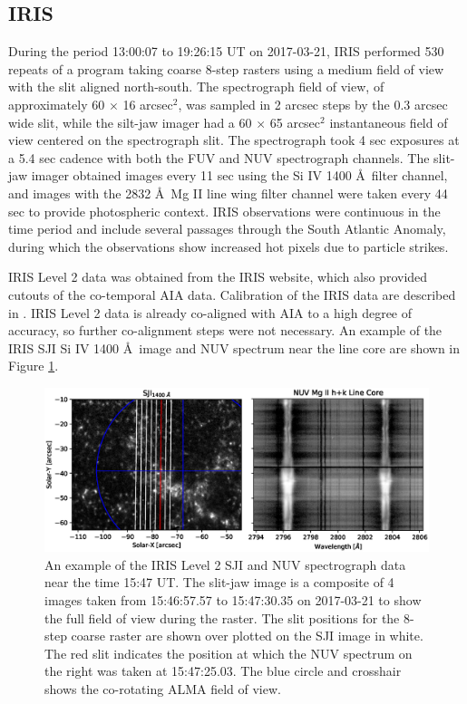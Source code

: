 \documentclass[twocolumn]{aastex62}
\begin{document}
\subsection{IRIS}
During the period 13:00:07 to 19:26:15 UT on 2017-03-21, IRIS performed 530 repeats of a program taking coarse 8-step rasters using a medium field of view with the slit aligned north-south.  The spectrograph field of view, of approximately 60 $\times$ 16 arcsec$^2$, was sampled in 2 arcsec steps by the 0.3 arcsec wide slit, while the silt-jaw imager had a 60 $\times$ 65 arcsec$^2$ instantaneous field of view centered on the spectrograph slit.  The spectrograph took 4 sec exposures at a 5.4 sec cadence with both the FUV and NUV spectrograph channels. The slit-jaw imager obtained images every 11 sec using the Si IV 1400 \AA\ filter channel, and images with the 2832 \AA\ Mg II line wing filter channel were taken every 44 sec to provide photospheric context.  IRIS observations were continuous in the time period and include several passages through the South Atlantic Anomaly, during which the observations show increased hot pixels due to particle strikes.

IRIS Level 2 data was obtained from the IRIS website, which also provided cutouts of the co-temporal AIA data.  Calibration of the IRIS data are described in \citet{wuelser18}.  IRIS Level 2 data is already co-aligned with AIA to a high degree of accuracy, so further co-alignment steps were not necessary.  An example of the IRIS SJI Si IV 1400 \AA\ image and NUV spectrum near the line core are shown in Figure \ref{fig:IRIS}.

\begin{figure}
    \centering
    \includegraphics[width=7in]{./figures/IRIS_example.eps}
    \caption{An example of the IRIS Level 2 SJI and NUV spectrograph data near the time 15:47 UT.  The slit-jaw image is a composite of 4 images taken from 15:46:57.57 to 15:47:30.35 on 2017-03-21 to show the full field of view during the raster.  The slit positions for the 8-step coarse raster are shown over plotted on the SJI image in white.  The red slit indicates the position at which the NUV spectrum on the right was taken at 15:47:25.03.  The blue circle and crosshair shows the co-rotating ALMA field of view.}
    \label{fig:IRIS}
\end{figure}
\end{document}
